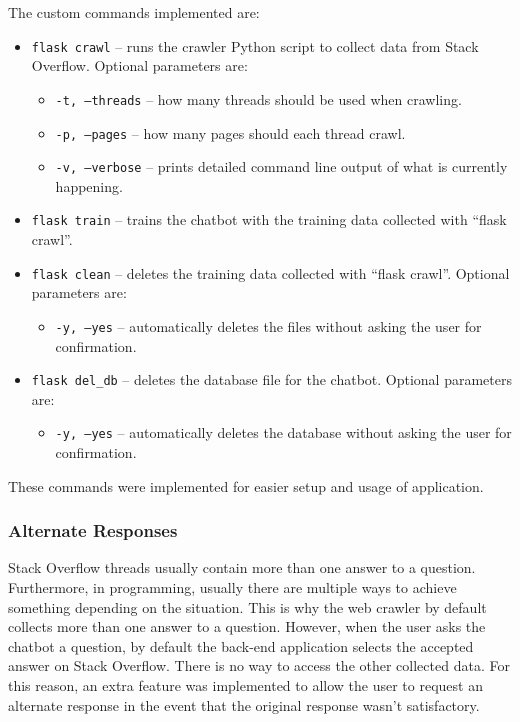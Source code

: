 \documentclass[12pt,a4paper]{article}
\begin{document}
The custom commands implemented are:
\begin{itemize}
    \item \texttt{flask crawl} – runs the crawler Python script to collect data from Stack Overflow. Optional parameters are:
    \begin{itemize}
        \item \texttt{-t, --threads} – how many threads should be used when crawling.
        \item \texttt{-p, --pages} – how many pages should each thread crawl.
        \item \texttt{-v, --verbose} – prints detailed command line output of what is currently happening.
    \end{itemize}
    \item \texttt{flask train} – trains the chatbot with the training data collected with “flask crawl”.
    \item \texttt{flask clean} – deletes the training data collected with “flask crawl”. Optional parameters are:
    \begin{itemize}
        \item \texttt{-y, --yes} – automatically deletes the files without asking the user for confirmation.
    \end{itemize}
    \item \texttt{flask del\_db} – deletes the database file for the chatbot. Optional parameters are:
    \begin{itemize}
        \item \texttt{-y, --yes} – automatically deletes the database without asking the user for confirmation.
    \end{itemize}        
\end{itemize}

These commands were implemented for easier setup and usage of application.

\subsubsection{Alternate Responses}
Stack Overflow threads usually contain more than one answer to a question. Furthermore, in programming, usually there are multiple ways to achieve something depending on the situation. This is why the web crawler by default collects more than one answer to a question. However, when the user asks the chatbot a question, by default the back-end application selects the accepted answer on Stack Overflow. There is no way to access the other collected data. For this reason, an extra feature was implemented to allow the user to request an alternate response in the event that the original response wasn’t satisfactory.
\end{document}
